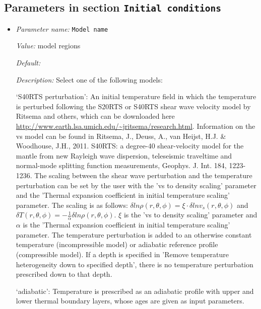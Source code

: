 \subsection{Parameters in section \tt Initial conditions}
\label{parameters:Initial_20conditions}

\begin{itemize}
\item {\it Parameter name:} {\tt Model name}
\label{parameters:Initial conditions/Model name}


{\it Value:} model regions


{\it Default:} 


{\it Description:} Select one of the following models:

`S40RTS perturbation': An initial temperature field in which the temperature is perturbed following the S20RTS or S40RTS shear wave velocity model by Ritsema and others, which can be downloaded here \url{http://www.earth.lsa.umich.edu/~jritsema/research.html}. Information on the vs model can be found in Ritsema, J., Deuss, A., van Heijst, H.J. \& Woodhouse, J.H., 2011. S40RTS: a degree-40 shear-velocity model for the mantle from new Rayleigh wave dispersion, teleseismic traveltime and normal-mode splitting function measurements, Geophys. J. Int. 184, 1223-1236. The scaling between the shear wave perturbation and the temperature perturbation can be set by the user with the 'vs to density scaling' parameter and the 'Thermal expansion coefficient in initial temperature scaling' parameter. The scaling is as follows: $\delta ln \rho (r,\theta,\phi) = \xi \cdot \delta ln v_s(r,\theta, \phi)$ and $\delta T(r,\theta,\phi) = - \frac{1}{\alpha} \delta ln \rho(r,\theta,\phi)$. $\xi$ is the 'vs to density scaling' parameter and $\alpha$ is the 'Thermal expansion coefficient in initial temperature scaling' parameter. The temperature perturbation is added to an otherwise constant temperature (incompressible model) or adiabatic reference profile (compressible model). If a depth is specified in 'Remove temperature heterogeneity down to specified depth', there is no temperature perturbation prescribed down to that depth.

`adiabatic': Temperature is prescribed as an adiabatic profile with upper and lower thermal boundary layers, whose ages are given as input parameters.


\end{itemize}
